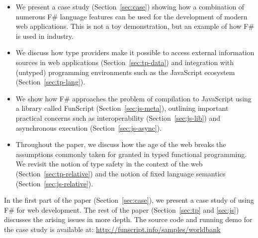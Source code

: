 \documentclass[submission,copyright,creativecommons]{eptcs}
\begin{document}
\begin{itemize}
\item We present a case study (Section~\ref{sec:case}) showing how a combination of numerous
  F\# language features can be used for the development of modern web applications. This
  is not a toy demonstration, but an example of how F\# is used in industry.

\item We discuss how type providers make it possible to access external information sources
  in web applications (Section~\ref{sec:tp-data}) and integration with (untyped) programming
  environments such as the JavaScript ecosystem (Section~\ref{sec:tp-lang}).

\item We show how F\# approaches the problem of compilation to JavaScript using a library
  called FunScript (Section~\ref{sec:js-meta}), outlining important practical concerns such as
  interoperability (Section~\ref{sec:js-lib}) and asynchronous execution (Section~\ref{sec:js-async}).

\item Throughout the paper, we discuss how the age of the web breaks the assumptions commonly
  taken for granted in typed functional programming. We revisit the notion of type safety
  in the context of the web (Section~\ref{sec:tp-relative}) and the notion of fixed language
  semantics (Section~\ref{sec:js-relative}).
\end{itemize}

\noindent
In the first part of the paper (Section~\ref{sec:case}), we present a case study of using
F\# for web development. The rest of the paper (Section~\ref{sec:tp} and \ref{sec:js}) discusses
the arising issues in more depth. The source code and running demo for the case study is available
at: \url{http://funscript.info/samples/worldbank}



%
\end{document}
